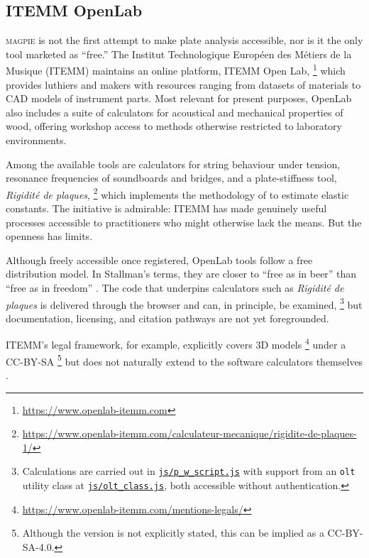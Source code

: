 \subsection{ITEMM OpenLab}

\textsc{magpie} is not the first attempt to make plate analysis accessible, nor is it the only tool marketed as ``free.'' The Institut Technologique Européen des Métiers de la Musique (ITEMM) maintains an online platform, ITEMM Open Lab,%
\footnote{\url{https://www.openlab-itemm.com}} which provides luthiers and makers with resources ranging from datasets of materials to CAD models of instrument parts. Most relevant for present purposes, OpenLab also includes a suite of calculators for acoustical and mechanical properties of wood, offering workshop access to methods otherwise restricted to laboratory environments. 

Among the available tools are calculators for string behaviour under tension, resonance frequencies of soundboards and bridges, and a plate-stiffness tool, \textit{Rigidité de plaques},%
\footnote{\url{https://www.openlab-itemm.com/calculateur-mecanique/rigidite-de-plaques-1/}} which implements the methodology of \textcite{mcintyre_measuring_1988} to estimate elastic constants. The initiative is admirable: ITEMM has made genuinely useful processes accessible to practitioners who might otherwise lack the means. But the openness has limits.

Although freely accessible once registered, OpenLab tools follow a free distribution model. In Stallman’s terms, they are closer to ``free as in beer'' than ``free as in freedom'' \cite{stallman_why_2007}. 
The code that underpins calculators such as \textit{Rigidité de plaques} is delivered through the browser and can, in principle, be examined,
\footnote{Calculations are carried out in \href{https://www.openlab-itemm.com/wp-content/plugins/ITEMM-OpenLab-tools-main/js/p_w_script.js}{\texttt{js/p\_w\_script.js}} with support from an \texttt{olt} utility class at \href{https://www.openlab-itemm.com/wp-content/plugins/ITEMM-OpenLab-tools-main/js/olt_class.js}{\texttt{js/olt\_class.js}}, both accessible without authentication.} 
but documentation, licensing, and citation pathways are not yet foregrounded.

ITEMM’s legal framework, for example, explicitly covers 3D models%
\footnote{\url{https://www.openlab-itemm.com/mentions-legals/}} 
under a CC-BY-SA
\footnote{Although the version is not explicitly stated, this can be implied as a CC-BY-SA-4.0.}
but does not naturally extend to the software calculators themselves \cite{cc_can_2025}. 

